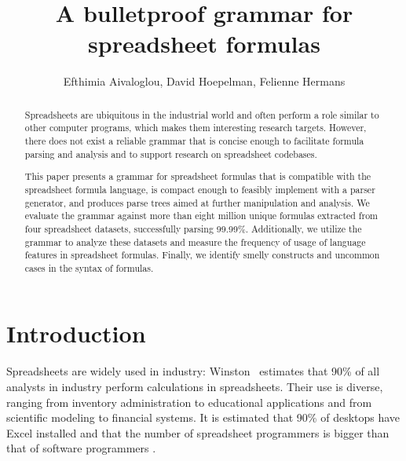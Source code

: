 \documentclass[times]{smrauth}
\begin{document}

\title{A bulletproof grammar for spreadsheet formulas}

\author{Efthimia Aivaloglou\corrauth, David Hoepelman, Felienne Hermans}

\address{Software Engineering Research Group, Delft University of Technology, Mekelweg 4, 2628 CD Delft, The Netherlands}


\begin{abstract}
Spreadsheets are ubiquitous in the industrial world and often perform a role similar to other computer programs, which makes them interesting research targets.
However, there does not exist a reliable grammar that is concise enough to facilitate formula parsing and analysis and to support research on spreadsheet codebases.

This paper presents a grammar for spreadsheet formulas that is compatible with the spreadsheet formula language, is compact enough to feasibly implement with a parser generator, and produces parse trees aimed at further manipulation and analysis. 
We evaluate the grammar against more than eight million unique formulas extracted from four spreadsheet datasets, successfully parsing 99.99\%.
Additionally, we utilize the grammar to analyze these datasets and measure the frequency of usage of language features in spreadsheet formulas.
Finally, we identify smelly constructs and uncommon cases in the syntax of formulas.
\end{abstract}


\maketitle

\section{Introduction}
Spreadsheets are widely used in industry: Winston~\cite{Wins2001} estimates that 90\% of all analysts in industry perform calculations in
spreadsheets. Their use is diverse, ranging from inventory administration to educational applications and from scientific
modeling to financial systems. It is estimated that 90\% of desktops have Excel installed \cite{DBLP:conf/icse/BradleyM09} and that the number of spreadsheet programmers is bigger than that of software programmers \cite{DBLP:conf/vl/ScaffidiSM05}. 
\end{document}
